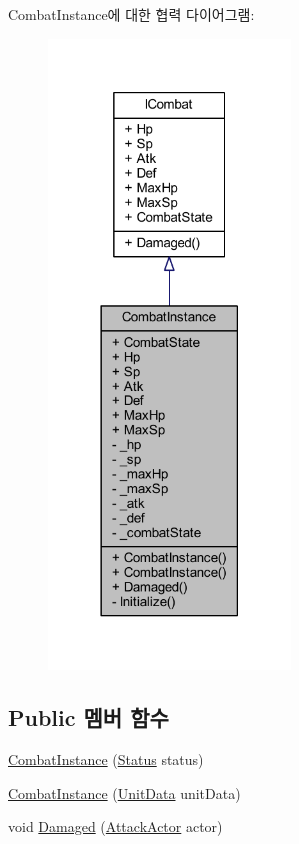 Combat\+Instance에 대한 협력 다이어그램\+:
\nopagebreak
\begin{figure}[H]
\begin{center}
\leavevmode
\includegraphics[width=182pt]{class_combat_instance__coll__graph}
\end{center}
\end{figure}
\subsection*{Public 멤버 함수}
\begin{DoxyCompactItemize}
\item 
\hyperlink{class_combat_instance_a613a6f5a211954d3f5f0d621cab88606}{Combat\+Instance} (\hyperlink{struct_status}{Status} status)
\item 
\hyperlink{class_combat_instance_a1f243136512dccd4c911fd62b11894ae}{Combat\+Instance} (\hyperlink{class_unit_data}{Unit\+Data} unit\+Data)
\item 
void \hyperlink{class_combat_instance_a612a867750ddfc0da7306e73752225b7}{Damaged} (\hyperlink{class_attack_actor}{Attack\+Actor} actor)
\end{DoxyCompactItemize}
